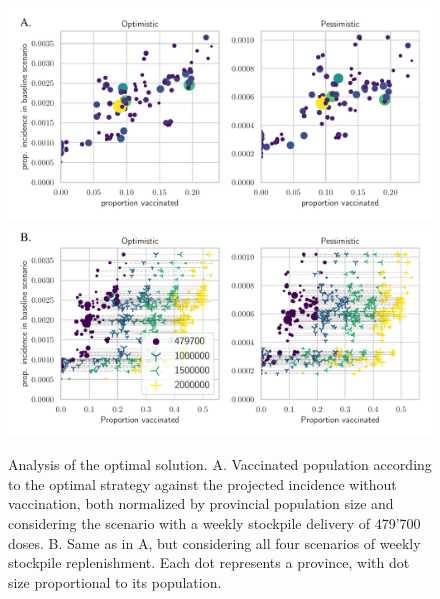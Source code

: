 \begin{figure}[!ht]
\centering
\includegraphics{fig_italy-ocp/figures/scatter_top.pdf}
\includegraphics{fig_italy-ocp/figures/scatter_scn.pdf}
\caption[Analysis of the optimal solution]{Analysis of the optimal solution. A. Vaccinated population according to the optimal strategy against the projected incidence without vaccination, both normalized by provincial population size and considering the scenario with a weekly stockpile delivery of 479'700 doses. B. Same as in A, but considering all four scenarios of weekly stockpile replenishment. Each dot represents a province, with dot size proportional to its population.}
    \label{fig:OC_scatter}
\end{figure}


